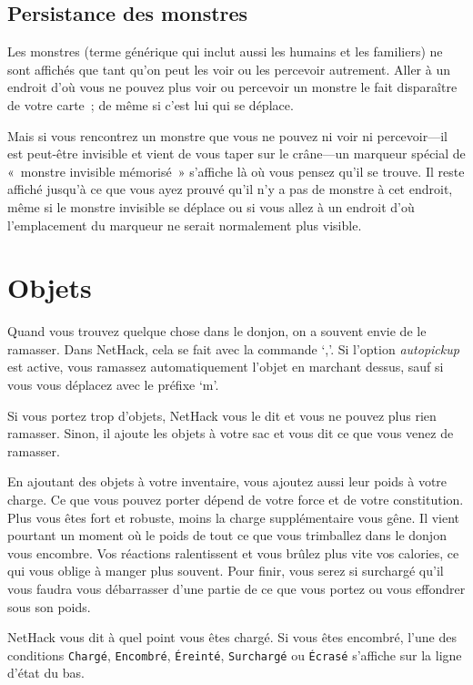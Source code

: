 \documentclass[titlepage]{article}
\begin{document}
\subsection{Persistance des monstres}



Les monstres (terme générique qui inclut aussi les humains et les
familiers) ne sont affichés que tant qu'on peut les voir ou les percevoir
autrement.
Aller à un endroit d'où vous ne pouvez plus voir ou percevoir un monstre le
fait disparaître de votre carte~; de même si c'est lui qui se déplace.


Mais si vous rencontrez un monstre que vous ne pouvez ni voir ni
percevoir---il est peut-être invisible et vient de vous taper sur le
crâne---un marqueur spécial de «~monstre invisible mémorisé~»
s'affiche là où vous pensez qu'il se trouve.
Il reste affiché jusqu'à ce que vous ayez prouvé qu'il n'y a pas de monstre
à cet endroit, même si le monstre invisible se déplace ou si vous allez à un
endroit d'où l'emplacement du marqueur ne serait normalement plus visible.

\section{Objets}



Quand vous trouvez quelque chose dans le donjon, on a souvent envie de le
ramasser.
Dans NetHack, cela se fait avec la commande `,'.
Si l'option
\textit{autopickup}
est active, vous ramassez automatiquement l'objet en marchant dessus, sauf
si vous vous déplacez avec le préfixe `m'.


Si vous portez trop d'objets, NetHack vous le dit et vous ne pouvez plus
rien ramasser.
Sinon, il ajoute les objets à votre sac et vous dit ce que vous venez de
ramasser.


En ajoutant des objets à votre inventaire, vous ajoutez aussi leur poids à
votre charge.
Ce que vous pouvez porter dépend de votre force et de votre constitution.
Plus vous êtes fort et robuste, moins la charge supplémentaire vous gêne.
Il vient pourtant un moment où le poids de tout ce que vous trimballez dans
le donjon vous encombre.
Vos réactions ralentissent et vous brûlez plus vite vos calories, ce qui
vous oblige à manger plus souvent.
Pour finir, vous serez si surchargé qu'il vous faudra vous débarrasser
d'une partie de ce que vous portez ou vous effondrer sous son poids.


NetHack vous dit à quel point vous êtes chargé.
Si vous êtes encombré, l'une des conditions
\texttt{Chargé}, \texttt{Encombré}, \texttt{Éreinté}, \texttt{Surchargé} ou
\texttt{Écrasé} s'affiche sur la ligne d'état du bas.
\end{document}
